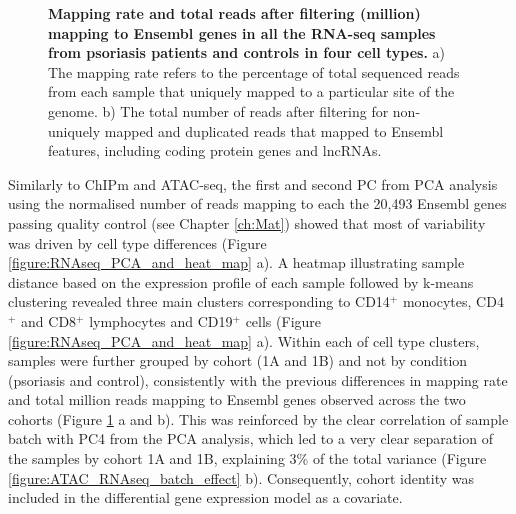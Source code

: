 \begin{figure}[htbp]
\caption[Mapping rate and total reads after filtering (million) mapping to Ensembl genes in all the RNA-seq samples from psoriasis patients and controls in four cell types.]{\textbf{Mapping rate and total reads after filtering (million) mapping to Ensembl genes in all the RNA-seq samples from psoriasis patients and controls in four cell types.} a) The mapping rate refers to the percentage of total sequenced reads from each sample that uniquely mapped to a particular site of the genome. b) The total number of reads after filtering for non-uniquely mapped and duplicated reads that mapped to Ensembl features, including coding protein genes and lncRNAs.}
\label{figure:RNAseq_mapping_rate_and_reads_in_genes}
\end{figure} 


Similarly to ChIPm and ATAC-seq, the first and second PC from PCA analysis using the normalised number of reads mapping to each the 20,493 Ensembl genes passing quality control (see Chapter \ref{ch:Mat}) showed that most of variability was driven by cell type differences (Figure \ref{figure:RNAseq_PCA_and_heat_map} a). A heatmap illustrating sample distance based on the expression profile of each sample followed by k-means clustering revealed three main clusters corresponding to CD14$^+$ monocytes, CD4$^+$ and CD8$^+$ lymphocytes and CD19$^+$ cells (Figure \ref{figure:RNAseq_PCA_and_heat_map} a). Within each of cell type clusters, samples were further grouped by cohort (1A and 1B) and not by condition (psoriasis and control), consistently with the previous differences in mapping rate and total million reads mapping to Ensembl genes observed across the two cohorts (Figure \ref{figure:RNAseq_mapping_rate_and_reads_in_genes} a and b). This was reinforced by the clear correlation of sample batch with PC4 from the PCA analysis, which led to a very clear separation of the samples by cohort 1A and 1B, explaining 3\% of the total variance (Figure \ref{figure:ATAC_RNAseq_batch_effect} b). Consequently, cohort identity was included in the differential gene expression model as a covariate. 

